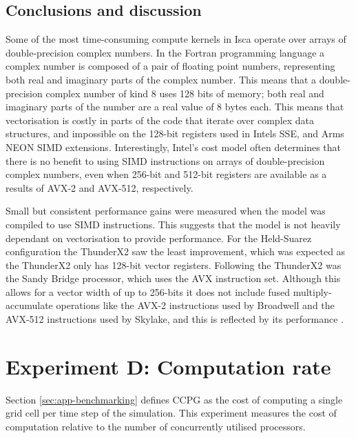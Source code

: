 \documentclass[a4paper,11pt]{report}
\begin{document}
\subsection{Conclusions and discussion}
Some of the most time-consuming compute kernels in Isca operate over arrays of double-precision complex numbers. In the Fortran programming language a complex number is composed of a pair of floating point numbers, representing both real and imaginary parts of the complex number. This means that a double-precision complex number of kind 8 uses 128 bits of memory; both real and imaginary parts of the number are a real value of 8 bytes each. This means that vectorisation is costly in parts of the code that iterate over complex data structures, and impossible on the 128-bit registers used in Intels SSE, and Arms NEON SIMD extensions. Interestingly, Intel's cost model often determines that there is no benefit to using SIMD instructions on arrays of double-precision complex numbers, even when 256-bit and 512-bit registers are available as a results of AVX-2 and AVX-512, respectively.
\par
Small but consistent performance gains were measured when the model was compiled to use SIMD instructions. This suggests that the model is not heavily dependant on vectorisation to provide performance. For the Held-Suarez configuration the ThunderX2 saw the least improvement, which was expected as the ThunderX2 only has 128-bit vector registers. Following the ThunderX2 was the Sandy Bridge processor, which uses the AVX instruction set. Although this allows for a vector width of up to 256-bits it does not include fused multiply-accumulate operations like the AVX-2 instructions used by Broadwell and the AVX-512 instructions used by Skylake, and this is reflected by its performance \cite{reinders2013intel, intel2017avx}.



\section{Experiment D: Computation rate}
Section \ref{sec:app-benchmarking} defines CCPG as the cost of computing a single grid cell per time step of the simulation. This experiment measures the cost of computation relative to the number of concurrently utilised processors. %
\label{sec:comm-analysis}
\end{document}
